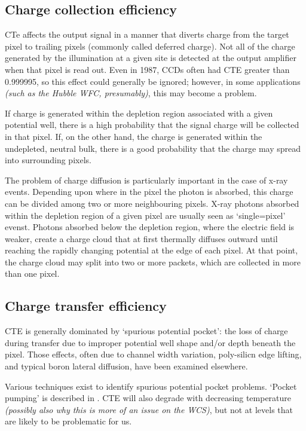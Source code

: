 \documentclass[10pt,fleqn]{article}
\begin{document}
{\subsection{Charge collection efficiency}

CTe affects the output signal in a manner that diverts charge from the target pixel to trailing pixels (commonly called deferred charge). Not all of the charge generated by the illumination at a given site is detected at the output amplifier when that pixel is read out. Even in 1987, CCDs often had CTE greater than 0.999995, so this effect could generally be ignored; however, in some applications \emph{(such as the Hubble WFC, presumably)}, this may become a problem.

If charge is generated within the depletion region associated with a given potential well, there is a high probability that the signal charge will be collected in that pixel. If, on the other hand, the charge is generated within the undepleted, neutral bulk, there is a good probability that the charge may spread into surrounding pixels.

The problem of charge diffusion is particularly important in the case of x-ray events. Depending upon where in the pixel the photon is absorbed, this charge can be divided among two or more neighbouring pixels. X-ray photons absorbed within the depletion region of a given pixel are usually seen as `single=pixel' evenst. Photons absorbed below the depletion region, where the electric field is weaker, create a charge cloud that at first thermally diffuses outward until reaching the rapidly changing potential at the edge of each pixel. At that point, the charge cloud may split into two or more packets, which are collected in more than one pixel.  

\subsection{Charge transfer efficiency}

CTE is generally dominated by `spurious potential pocket': the loss of charge during transfer due to improper potential well shape and/or depth beneath the pixel. Those effects, often due to channel width variation, poly-silicn edge lifting, and typical boron lateral diffusion, have been examined elsewhere.

Various techniques exist to identify spurious potential pocket problems. `Pocket pumping' is described in . CTE will also degrade with decreasing temperature \emph{(possibly also why this is more of an issue on the WCS)}, but not at levels that are likely to be problematic for us.

}
\end{document}
